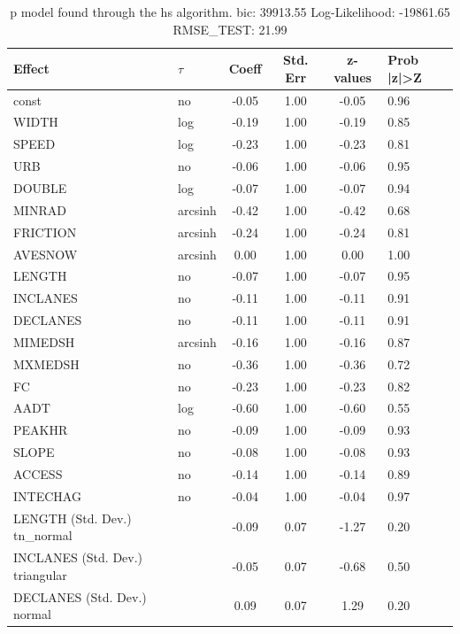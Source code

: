 \begin{table}
	\caption{p model found through the hs algorithm. bic: 39913.55 Log-Likelihood: -19861.65 RMSE_TEST: 21.99}
	\begin{center}
		\begin{tabular}{|l|l|c|c|c|l|}
			\hline
			Effect & $\tau$ & Coeff & Std. Err & z-values & Prob |z|>Z \\
			\hline
			const & no & -0.05 & 1.00 & -0.05 & 0.96 \\
			\hline
			WIDTH & log & -0.19 & 1.00 & -0.19 & 0.85 \\
			\hline
			SPEED & log & -0.23 & 1.00 & -0.23 & 0.81 \\
			\hline
			URB & no & -0.06 & 1.00 & -0.06 & 0.95 \\
			\hline
			DOUBLE & log & -0.07 & 1.00 & -0.07 & 0.94 \\
			\hline
			MINRAD & arcsinh & -0.42 & 1.00 & -0.42 & 0.68 \\
			\hline
			FRICTION & arcsinh & -0.24 & 1.00 & -0.24 & 0.81 \\
			\hline
			AVESNOW & arcsinh & 0.00 & 1.00 & 0.00 & 1.00 \\
			\hline
			LENGTH & no & -0.07 & 1.00 & -0.07 & 0.95 \\
			\hline
			INCLANES & no & -0.11 & 1.00 & -0.11 & 0.91 \\
			\hline
			DECLANES & no & -0.11 & 1.00 & -0.11 & 0.91 \\
			\hline
			MIMEDSH & arcsinh & -0.16 & 1.00 & -0.16 & 0.87 \\
			\hline
			MXMEDSH & no & -0.36 & 1.00 & -0.36 & 0.72 \\
			\hline
			FC & no & -0.23 & 1.00 & -0.23 & 0.82 \\
			\hline
			AADT & log & -0.60 & 1.00 & -0.60 & 0.55 \\
			\hline
			PEAKHR & no & -0.09 & 1.00 & -0.09 & 0.93 \\
			\hline
			SLOPE & no & -0.08 & 1.00 & -0.08 & 0.93 \\
			\hline
			ACCESS & no & -0.14 & 1.00 & -0.14 & 0.89 \\
			\hline
			INTECHAG & no & -0.04 & 1.00 & -0.04 & 0.97 \\
			\hline
			LENGTH (Std. Dev.) tn_normal &  & -0.09 & 0.07 & -1.27 & 0.20 \\
			\hline
			INCLANES (Std. Dev.) triangular &  & -0.05 & 0.07 & -0.68 & 0.50 \\
			\hline
			DECLANES (Std. Dev.) normal &  & 0.09 & 0.07 & 1.29 & 0.20 \\

\end{tabular}
\end{center}
\end{table}
